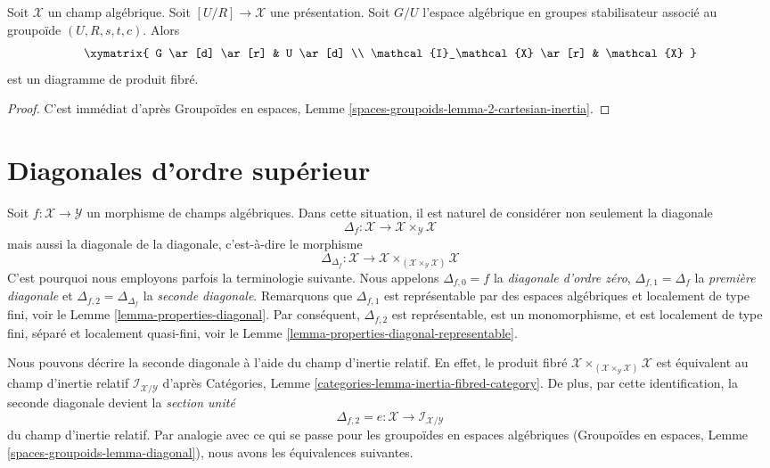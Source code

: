 \begin{lemma}
\label{lemma-presentation-inertia}
Soit $\mathcal{X}$ un champ algébrique. Soit
$[U/R] \to \mathcal{X}$ une présentation. Soit $G/U$ l'espace algébrique
en groupes stabilisateur associé au groupoïde $(U, R, s, t, c)$. Alors
$$
\xymatrix{
G \ar[d] \ar[r] & U \ar[d] \\
\mathcal{I}_\mathcal{X} \ar[r] & \mathcal{X}
}
$$
est un diagramme de produit fibré.
\end{lemma}

\begin{proof}
C'est immédiat d'après Groupoïdes en espaces, Lemme
\ref{spaces-groupoids-lemma-2-cartesian-inertia}.
\end{proof}









\section{Diagonales d'ordre supérieur}
\label{section-higher-diagonals}

\noindent
Soit $f : \mathcal{X} \to \mathcal{Y}$ un morphisme de champs algébriques.
Dans cette situation, il est naturel de considérer non seulement la diagonale
$$
\Delta_f : \mathcal{X} \to \mathcal{X} \times_\mathcal{Y} \mathcal{X}
$$
mais aussi la diagonale de la diagonale, c'est-à-dire le morphisme
$$
\Delta_{\Delta_f} :
\mathcal{X}
\longrightarrow
\mathcal{X} \times_{(\mathcal{X} \times_\mathcal{Y} \mathcal{X})} \mathcal{X}
$$
C'est pourquoi nous employons parfois la terminologie suivante. Nous appelons
$\Delta_{f, 0} = f$ la {\it diagonale d'ordre zéro},
$\Delta_{f, 1} = \Delta_f$ la {\it première diagonale} et
$\Delta_{f, 2} = \Delta_{\Delta_f}$ la {\it seconde diagonale}.
Remarquons que $\Delta_{f, 1}$ est représentable par des espaces algébriques
et localement de type fini, voir le Lemme \ref{lemma-properties-diagonal}.
Par conséquent, $\Delta_{f, 2}$ est représentable, est un monomorphisme, et
est localement de type fini, séparé et localement quasi-fini, voir le Lemme
\ref{lemma-properties-diagonal-representable}.

\medskip\noindent
Nous pouvons décrire la seconde diagonale à l'aide du champ d'inertie relatif.
En effet, le produit fibré
$\mathcal{X}
\times_{(\mathcal{X} \times_\mathcal{Y} \mathcal{X})} \mathcal{X}$
est équivalent au champ d'inertie relatif
$\mathcal{I}_{\mathcal{X}/\mathcal{Y}}$ d'après Catégories, Lemme
\ref{categories-lemma-inertia-fibred-category}. De plus, par cette
identification, la seconde diagonale devient la {\it section unité}
$$
\Delta_{f, 2} = e : \mathcal{X} \to \mathcal{I}_{\mathcal{X}/\mathcal{Y}}
$$
du champ d'inertie relatif. Par analogie avec ce qui se passe pour les
groupoïdes en espaces algébriques (Groupoïdes en espaces, Lemme
\ref{spaces-groupoids-lemma-diagonal}), nous avons les équivalences suivantes.

